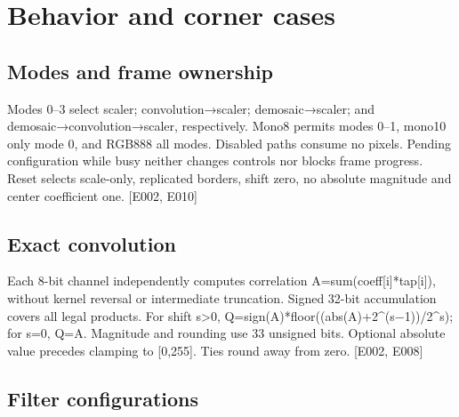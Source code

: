 \documentclass[11pt,a4paper]{article}
\begin{document}
\section{Behavior and corner cases}

\subsection{Modes and frame ownership}

Modes 0–3 select scaler; convolution{\vulcanmathsymbols →}scaler; demosaic{\vulcanmathsymbols →}scaler; and demosaic{\vulcanmathsymbols →}convolution{\vulcanmathsymbols →}scaler,\allowbreak{} respectively. Mono8 permits modes 0–1,\allowbreak{} mono10 only mode 0,\allowbreak{} and RGB888 all modes. Disabled paths consume no pixels. Pending configuration while busy neither changes controls nor blocks frame progress. Reset selects scale-only,\allowbreak{} replicated borders,\allowbreak{} shift zero,\allowbreak{} no absolute magnitude and center coefficient one. [\allowbreak{}E002,\allowbreak{} E010]\allowbreak{}

\subsection{Exact convolution}

Each 8-bit channel independently computes correlation A=\allowbreak{}sum(\allowbreak{}coeff[\allowbreak{}i]\allowbreak{}*\allowbreak{}tap[\allowbreak{}i]\allowbreak{})\allowbreak{},\allowbreak{} without kernel reversal or intermediate truncation. Signed 32-bit accumulation covers all legal products. For shift s>0,\allowbreak{} Q=\allowbreak{}sign(\allowbreak{}A)\allowbreak{}*\allowbreak{}floor(\allowbreak{}(\allowbreak{}abs(\allowbreak{}A)\allowbreak{}+\allowbreak{}2\textasciicircum{}(\allowbreak{}s{\vulcanmathsymbols −}1)\allowbreak{})\allowbreak{}/\allowbreak{}2\textasciicircum{}s)\allowbreak{}; for s=\allowbreak{}0,\allowbreak{} Q=\allowbreak{}A. Magnitude and rounding use 33 unsigned bits. Optional absolute value precedes clamping to [\allowbreak{}0,\allowbreak{}255]\allowbreak{}. Ties round away from zero. [\allowbreak{}E002,\allowbreak{} E008]\allowbreak{}

\subsection{Filter configurations}
\end{document}

